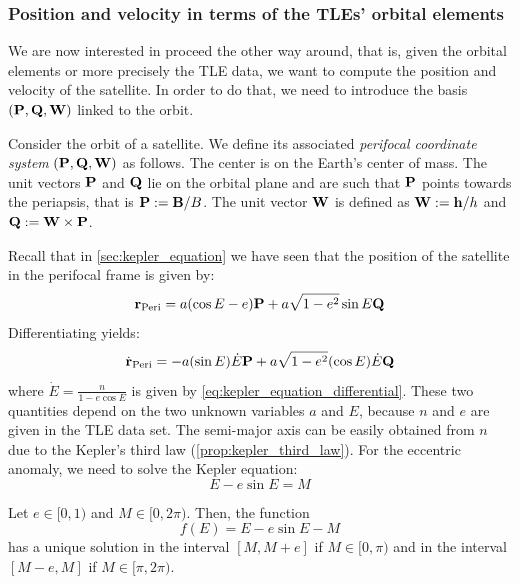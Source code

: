\documentclass[../main.tex]{subfiles}
\begin{document}
\subsubsection{Position and velocity in terms of the TLEs' orbital elements}
We are now interested in proceed the other way around, that is, given the orbital elements or more precisely the TLE data, we want to compute the position and velocity of the satellite. In order to do that, we need to introduce the basis $(\boldsymbol{\mathrm{P}}, \boldsymbol{\mathrm{Q}}, \boldsymbol{\mathrm{W}})$ linked to the orbit.
\begin{definition}\label{def:perifocal_coordinate_system}
  Consider the orbit of a satellite. We define its associated \emph{perifocal coordinate system} $(\boldsymbol{\mathrm{P}},\boldsymbol{\mathrm{Q}},\boldsymbol{\mathrm{W}})$ as follows. The center is on the Earth's center of mass. The unit vectors $\boldsymbol{\mathrm{P}}$ and $\boldsymbol{\mathrm{Q}}$ lie on the orbital plane and are such that $\boldsymbol{\mathrm{P}}$ points towards the periapsis, that is $\boldsymbol{\mathrm{P}}:=\boldsymbol{\mathrm{B}}/B$. The unit vector $\boldsymbol{\mathrm{W}}$ is defined as $\boldsymbol{\mathrm{W}}:=\boldsymbol{\mathrm{h}}/h$ and $\boldsymbol{\mathrm{Q}}:=\boldsymbol{\mathrm{W}}\times\boldsymbol{\mathrm{P}}$.
\end{definition}
Recall that in \cref{sec:kepler_equation} we have seen that the position of the satellite in the perifocal frame is given by:
\begin{equation}
  \boldsymbol{\mathrm{r}}_\mathrm{Peri} = a(\cos E-e)\boldsymbol{\mathrm{P}} + a\sqrt{1-e^2}\sin E\boldsymbol{\mathrm{Q}}
\end{equation}
Differentiating yields:
\begin{equation}
  \dot{\boldsymbol{\mathrm{r}}}_\mathrm{Peri} = - a (\sin E)\dot{E}\boldsymbol{\mathrm{P}}+a\sqrt{1-e^2}(\cos E)\dot{E}\boldsymbol{\mathrm{Q}}
\end{equation}
where $\dot{E}=\frac{n}{1-e\cos E}$ is given by \cref{eq:kepler_equation_differential}. These two quantities depend on the two unknown variables $a$ and $E$, because $n$ and $e$ are given in the TLE data set. The semi-major axis can be easily obtained from $n$ due to the Kepler's third law (\cref{prop:kepler_third_law}). For the eccentric anomaly, we need to solve the Kepler equation:
\begin{equation}
  E-e\sin E = M
\end{equation}
\begin{lemma}
  Let $e\in[0,1)$ and $M\in[0,2\pi)$. Then, the function
  \begin{equation}
    f(E) = E-e\sin E - M
  \end{equation}
  has a unique solution in the interval $[M, M+e]$ if $M\in[0,\pi)$ and in the interval $[M-e, M]$ if $M\in[\pi,2\pi)$.
\end{lemma}
\end{document}
